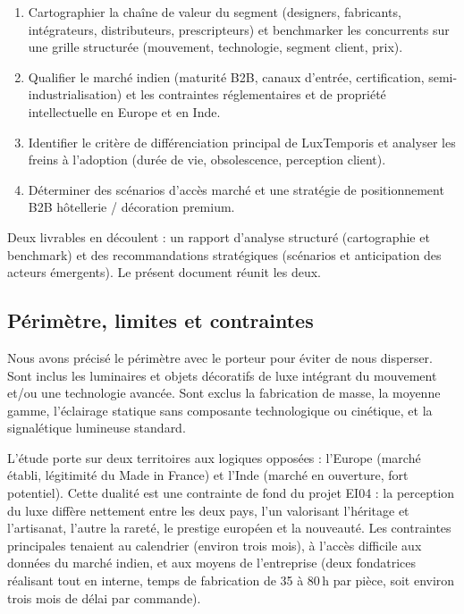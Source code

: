 \documentclass[11pt,a4paper]{article}
\begin{document}
\begin{enumerate}
  \item Cartographier la chaîne de valeur du segment (designers, fabricants, intégrateurs, distributeurs, prescripteurs) et benchmarker les concurrents sur une grille structurée (mouvement, technologie, segment client, prix).
  \item Qualifier le marché indien (maturité B2B, canaux d'entrée, certification, semi-industrialisation) et les contraintes réglementaires et de propriété intellectuelle en Europe et en Inde.
  \item Identifier le critère de différenciation principal de LuxTemporis et analyser les freins à l'adoption (durée de vie, obsolescence, perception client).
  \item Déterminer des scénarios d'accès marché et une stratégie de positionnement B2B hôtellerie / décoration premium.
\end{enumerate}

Deux livrables en découlent : un rapport d'analyse structuré (cartographie et benchmark) et des recommandations stratégiques (scénarios et anticipation des acteurs émergents). Le présent document réunit les deux.

\subsection{Périmètre, limites et contraintes}

Nous avons précisé le périmètre avec le porteur pour éviter de nous disperser. Sont inclus les luminaires et objets décoratifs de luxe intégrant du mouvement et/ou une technologie avancée. Sont exclus la fabrication de masse, la moyenne gamme, l'éclairage statique sans composante technologique ou cinétique, et la signalétique lumineuse standard.

L'étude porte sur deux territoires aux logiques opposées : l'Europe (marché établi, légitimité du Made in France) et l'Inde (marché en ouverture, fort potentiel). Cette dualité est une contrainte de fond du projet EI04 : la perception du luxe diffère nettement entre les deux pays, l'un valorisant l'héritage et l'artisanat, l'autre la rareté, le prestige européen et la nouveauté. Les contraintes principales tenaient au calendrier (environ trois mois), à l'accès difficile aux données du marché indien, et aux moyens de l'entreprise (deux fondatrices réalisant tout en interne, temps de fabrication de 35 à 80\,h par pièce, soit environ trois mois de délai par commande).
\end{document}
